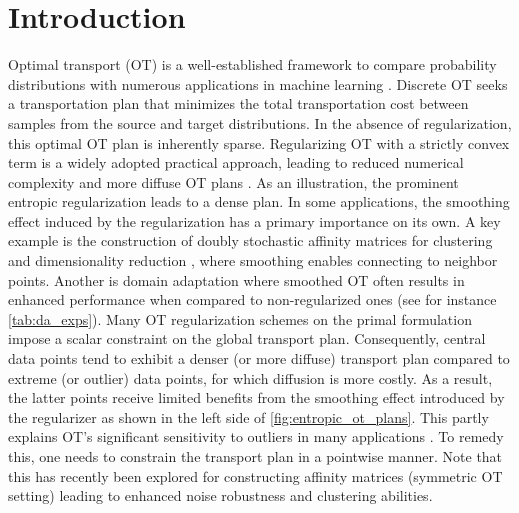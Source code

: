 
\section{Introduction}

Optimal transport (OT) is a well-established framework to compare probability distributions with numerous applications in machine learning \cite{arjovsky2017wasserstein, ozair2019wasserstein, peyre2019computational}.
Discrete OT seeks a transportation plan that minimizes the total transportation cost between samples from the source and target distributions.
In the absence of regularization, this optimal OT plan is inherently sparse. 
Regularizing OT with a strictly convex term is a widely adopted practical approach, leading to reduced numerical complexity and more diffuse OT plans \cite{peyre2019computational}.
As an illustration, the prominent entropic regularization \cite{cuturi2013sinkhorn} leads to a dense plan.
In some applications, the smoothing effect induced by the regularization has a primary importance on its own. A key example is the construction of doubly stochastic affinity matrices for clustering and dimensionality reduction \cite{landa2021doubly,Zass}, where smoothing enables connecting to neighbor points.
Another is domain adaptation \cite{courty2017joint} where smoothed OT often results in enhanced performance when compared to non-regularized ones (see for instance \cref{tab:da_exps}). Many OT regularization schemes on the primal formulation impose a scalar constraint on the global transport plan.
Consequently, central data points tend to exhibit a denser (or more diffuse) transport plan compared to extreme (or outlier) data points, for which diffusion is more costly. As a result, the latter points receive limited benefits from the smoothing effect introduced by the regularizer as shown in the left side of \cref{fig:entropic_ot_plans}. This partly explains OT's significant sensitivity to outliers in many applications \cite{mukherjee2021outlier, pmlr-v202-chuang23a}. 
To remedy this, one needs to constrain the transport plan in a pointwise manner.
Note that this has recently been explored for constructing affinity matrices \cite{van2023snekhorn} (\ie symmetric OT setting) leading to enhanced noise robustness and clustering abilities.

